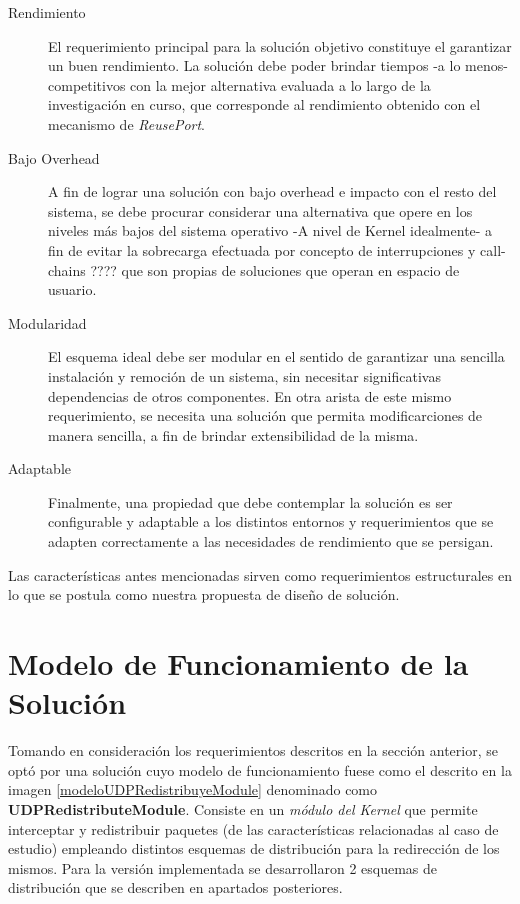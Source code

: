 \begin{description}
\item[Rendimiento] El requerimiento principal para la solución objetivo constituye el garantizar un buen rendimiento. La solución debe poder brindar tiempos -a lo menos- competitivos con la mejor alternativa evaluada a lo largo de la investigación en curso, que corresponde al rendimiento obtenido con el mecanismo de \emph{ReusePort}.
\item[Bajo Overhead] A fin de lograr una solución con bajo overhead e impacto con el resto del sistema, se debe procurar considerar una alternativa que opere en los niveles más bajos del sistema operativo -A nivel de Kernel idealmente- a fin de evitar la sobrecarga efectuada por concepto de interrupciones y call-chains ???? que son propias de soluciones que operan en espacio de usuario.
\item[Modularidad] El esquema ideal debe ser modular en el sentido de garantizar una sencilla instalación y remoción de un sistema, sin necesitar significativas dependencias de otros componentes. En otra arista de este mismo requerimiento, se necesita una solución que permita modificarciones de manera sencilla, a fin de brindar extensibilidad de la misma.
\item[Adaptable] Finalmente, una propiedad que debe contemplar la solución es ser configurable y adaptable a los distintos entornos y requerimientos que se adapten correctamente a las necesidades de rendimiento que se persigan.
\end{description}

Las características antes mencionadas sirven como requerimientos estructurales en lo que se postula como nuestra propuesta de diseño de solución.

\section{Modelo de Funcionamiento de la Solución}
Tomando en consideración los requerimientos descritos en la sección anterior, se optó por una solución cuyo modelo de funcionamiento fuese como el descrito en la imagen \ref{modeloUDPRedistribuyeModule} denominado como \textbf{UDPRedistributeModule}. Consiste en un \emph{módulo del Kernel} que permite interceptar y redistribuir paquetes (de las características relacionadas al caso de estudio) empleando distintos esquemas de distribución para la redirección de los mismos. Para la versión implementada se desarrollaron 2 esquemas de distribución que se describen en apartados posteriores.

